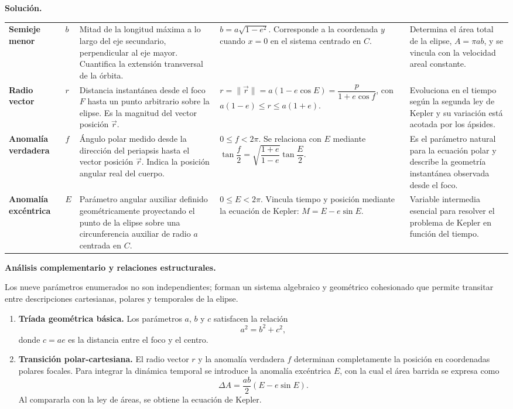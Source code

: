 \documentclass[11pt]{article}
\theoremstyle{prismstyle}
\newenvironment{solution}[1][Solución]
  {\par\textbf{#1.}\ }
  {\par}
\begin{document}
\begin{solution}
{\begin{longtable}{@{}L{0.11\textwidth}L{0.08\textwidth}L{0.23\textwidth}L{0.24\textwidth}L{0.22\textwidth}@{}}
\textbf{Semieje menor} & $b$ & Mitad de la longitud máxima a lo largo del eje secundario, perpendicular al eje mayor. Cuantifica la extensión transversal de la órbita. & $b = a\sqrt{1-e^2}$. Corresponde a la coordenada $y$ cuando $x=0$ en el sistema centrado en $C$. & Determina el área total de la elipse, $A = \pi ab$, y se vincula con la velocidad areal constante. \\
\textbf{Radio vector} & $r$ & Distancia instantánea desde el foco $F$ hasta un punto arbitrario sobre la elipse. Es la magnitud del vector posición $\vec{r}$. & $r = \|\vec{r}\| = a(1-e\cos E) = \dfrac{p}{1+e\cos f}$, con $a(1-e) \le r \le a(1+e)$. & Evoluciona en el tiempo según la segunda ley de Kepler y su variación está acotada por los ápsides. \\
\textbf{Anomalía verdadera} & $f$ & Ángulo polar medido desde la dirección del periapsis hasta el vector posición $\vec{r}$. Indica la posición angular real del cuerpo. & $0 \le f < 2\pi$. Se relaciona con $E$ mediante $\tan\dfrac{f}{2} = \sqrt{\dfrac{1+e}{1-e}}\tan\dfrac{E}{2}$. & Es el parámetro natural para la ecuación polar y describe la geometría instantánea observada desde el foco. \\
\textbf{Anomalía excéntrica} & $E$ & Parámetro angular auxiliar definido geométricamente proyectando el punto de la elipse sobre una circunferencia auxiliar de radio $a$ centrada en $C$. & $0 \le E < 2\pi$. Vincula tiempo y posición mediante la ecuación de Kepler: $M = E - e\sin E$. & Variable intermedia esencial para resolver el problema de Kepler en función del tiempo. \\
\end{longtable}
}

\textbf{Análisis complementario y relaciones estructurales.}

Los nueve parámetros enumerados no son independientes; forman un sistema algebraico y geométrico cohesionado que permite transitar entre descripciones cartesianas, polares y temporales de la elipse.

\begin{enumerate}
  \item \textbf{Tríada geométrica básica.} Los parámetros $a$, $b$ y $c$ satisfacen la relación
  \[
  a^2 = b^2 + c^2,
  \]
  donde $c = ae$ es la distancia entre el foco y el centro.

  \item \textbf{Transición polar-cartesiana.} El radio vector $r$ y la anomalía verdadera $f$ determinan completamente la posición en coordenadas polares focales. Para integrar la dinámica temporal se introduce la anomalía excéntrica $E$, con la cual el área barrida se expresa como
  \[
  \Delta A = \frac{ab}{2}(E - e\sin E).
  \]
  Al compararla con la ley de áreas, se obtiene la ecuación de Kepler.


\end{enumerate}
\end{solution}
\end{document}
